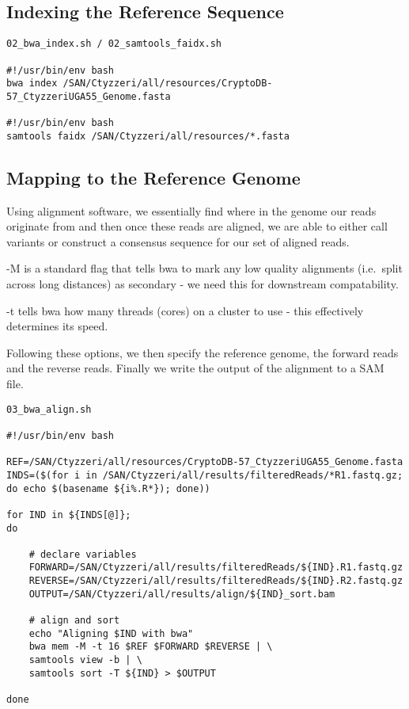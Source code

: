\documentclass[
]{article}
\begin{document}
\hypertarget{indexing-the-reference-sequence}{%
\subsection{Indexing the Reference
Sequence}\label{indexing-the-reference-sequence}}

\begin{verbatim}
02_bwa_index.sh / 02_samtools_faidx.sh

#!/usr/bin/env bash
bwa index /SAN/Ctyzzeri/all/resources/CryptoDB-57_CtyzzeriUGA55_Genome.fasta

#!/usr/bin/env bash
samtools faidx /SAN/Ctyzzeri/all/resources/*.fasta
\end{verbatim}

\hypertarget{mapping-to-the-reference-genome}{%
\subsection{Mapping to the Reference
Genome}\label{mapping-to-the-reference-genome}}

Using alignment software, we essentially find where in the genome our
reads originate from and then once these reads are aligned, we are able
to either call variants or construct a consensus sequence for our set of
aligned reads.

-M is a standard flag that tells bwa to mark any low quality alignments
(i.e.~split across long distances) as secondary - we need this for
downstream compatability.

-t tells bwa how many threads (cores) on a cluster to use - this
effectively determines its speed.

Following these options, we then specify the reference genome, the
forward reads and the reverse reads. Finally we write the output of the
alignment to a SAM file.

\begin{verbatim}
03_bwa_align.sh

#!/usr/bin/env bash

REF=/SAN/Ctyzzeri/all/resources/CryptoDB-57_CtyzzeriUGA55_Genome.fasta
INDS=($(for i in /SAN/Ctyzzeri/all/results/filteredReads/*R1.fastq.gz; do echo $(basename ${i%.R*}); done))

for IND in ${INDS[@]};
do

    # declare variables
    FORWARD=/SAN/Ctyzzeri/all/results/filteredReads/${IND}.R1.fastq.gz
    REVERSE=/SAN/Ctyzzeri/all/results/filteredReads/${IND}.R2.fastq.gz
    OUTPUT=/SAN/Ctyzzeri/all/results/align/${IND}_sort.bam

    # align and sort
    echo "Aligning $IND with bwa"
    bwa mem -M -t 16 $REF $FORWARD $REVERSE | \
    samtools view -b | \
    samtools sort -T ${IND} > $OUTPUT

done
\end{verbatim}
\end{document}

